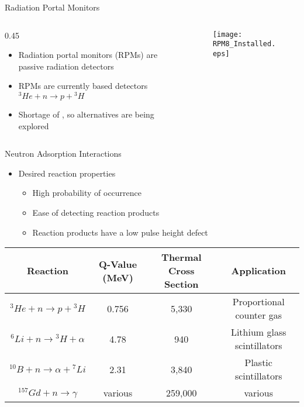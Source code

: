 \begin{frame}{Radiation Portal Monitors}
\begin{columns}[onlytextwidth]
	\begin{column} {0.45\textwidth}
  	\begin{itemize}
  		\item Radiation portal monitors (RPMs) are passive radiation detectors
  		\item {
  			 RPMs are currently  based detectors
  			\center
    		${}^3He +n \to p +{}^3H$
    	}
  		\item Shortage of , so alternatives are being explored
  		\end{itemize}
	\end{column}
	\begin{column}{0.5\textwidth}
		\centering
		\begin{figure}
			\texttt{[image: RPM8\_Installed.eps]}
			\end{figure}
	\end{column}
\end{columns}
\end{frame}


\begin{frame}{Neutron Adsorption Interactions}
\begin{itemize}
	\item Desired reaction properties
	\begin{itemize}
		\item High probability of occurrence
		\item Ease of detecting reaction products
		\item Reaction products have a low pulse height defect
	\end{itemize}
\end{itemize}
\begin{table}
	\tiny
	\begin{tabular}{ c | c c c} 
		Reaction                           & Q-Value (MeV) & Thermal Cross Section & Application \\
		\hline
		\hline
		${}^3He + n \to p +{}^3H$          & 0.756     & 5,330 & Proportional counter gas \\
		${}^6Li + n \to {}^3H + \alpha$    & 4.78      & 940 & Lithium glass scintillators \\
		${}^{10}B + n \to \alpha + {}^7Li$ & 2.31      & 3,840 & Plastic scintillators \\
		${}^{157}Gd + n \to \gamma$        &various    & 259,000 & various \\
	\end{tabular}
\end{table}
\end{frame}


